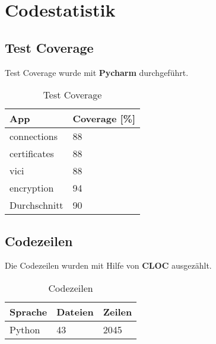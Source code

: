 \section{Codestatistik}
\subsection{Test Coverage}
Test Coverage wurde mit \textbf{Pycharm} durchgeführt. \\

\begin{table}[H]
\centering
    \begin{tabular}{|p{6cm}|p{6cm}|}
    \hline    
    \rowcolor{lightblue}
	App & Coverage [\%] \\ \hline
	connections & 88 \\ \hline    
	certificates & 88 \\ \hline   
	vici & 88 \\ \hline  
	encryption & 94 \\ \hline  
	\rowcolor{lightblue}
	Durchschnitt &   90 \\ \hline
    \end{tabular}
    \caption[Test Coverage]{Test Coverage}
\end{table}

\subsection{Codezeilen}
Die Codezeilen wurden mit Hilfe von \textbf{CLOC} \cite{CLOC} ausgezählt. \\

\begin{table}[H]
\centering
    \begin{tabular}{|p{3cm} |p{3cm} |p{3cm} |}
    \hline    
    \rowcolor{lightblue}
	Sprache & Dateien & Zeilen  \\ \hline   
	Python & 43 & 2045 \\ \hline
    \end{tabular}
    \caption[Codezeilen]{Codezeilen}
\end{table}

